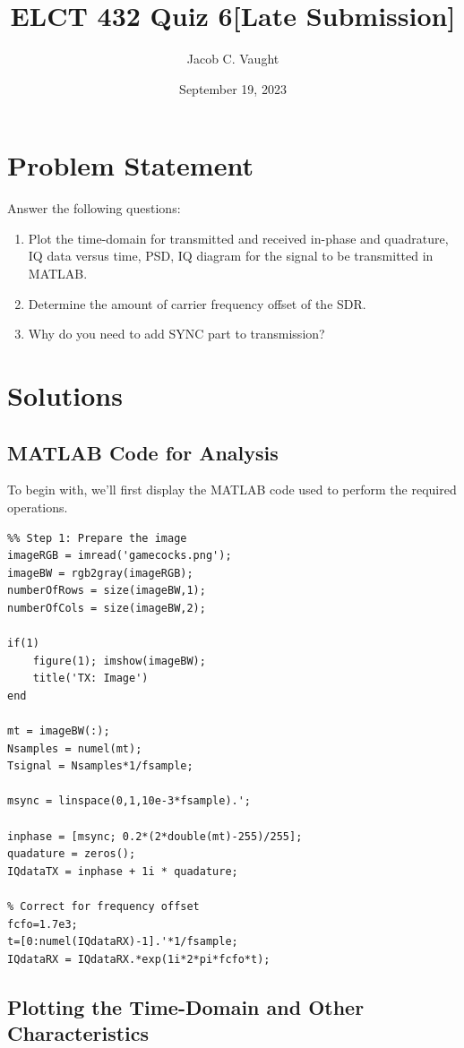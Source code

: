 \documentclass{article}
\begin{document}
\title{ELCT 432 Quiz 6[Late Submission]}
\author{Jacob C. Vaught}
\date{September 19, 2023}
\maketitle

\section*{Problem Statement}
Answer the following questions:
\begin{enumerate}
    \item Plot the time-domain for transmitted and received in-phase and quadrature, IQ data versus time, PSD, IQ diagram for the signal to be transmitted in MATLAB.
    \item Determine the amount of carrier frequency offset of the SDR.
    \item Why do you need to add SYNC part to transmission?
\end{enumerate}

\section*{Solutions}

\subsection*{MATLAB Code for Analysis}
To begin with, we'll first display the MATLAB code used to perform the required operations.

\begin{verbatim}
%% Step 1: Prepare the image
imageRGB = imread('gamecocks.png');
imageBW = rgb2gray(imageRGB);
numberOfRows = size(imageBW,1);
numberOfCols = size(imageBW,2);

if(1)
    figure(1); imshow(imageBW);
    title('TX: Image')
end

mt = imageBW(:);
Nsamples = numel(mt);
Tsignal = Nsamples*1/fsample;

msync = linspace(0,1,10e-3*fsample).';

inphase = [msync; 0.2*(2*double(mt)-255)/255];
quadature = zeros();
IQdataTX = inphase + 1i * quadature;

% Correct for frequency offset
fcfo=1.7e3;
t=[0:numel(IQdataRX)-1].'*1/fsample;
IQdataRX = IQdataRX.*exp(1i*2*pi*fcfo*t);
\end{verbatim}


\subsection*{Plotting the Time-Domain and Other Characteristics}
\end{document}
